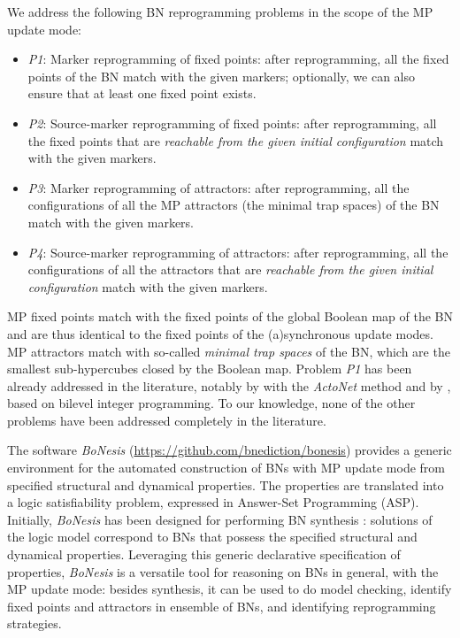 \documentclass[PCJ,Unicode,screen,mode=plain]{cedram}
\begin{document}
We address the following BN reprogramming problems in the scope of the
MP update mode:

\begin{itemize}
\item
  \emph{P1}: Marker reprogramming of fixed points: after reprogramming,
  all the fixed points of the BN match with the given markers;
  optionally, we can also ensure that at least one fixed point exists.
\item
  \emph{P2}: Source-marker reprogramming of fixed points: after
  reprogramming, all the fixed points that are \emph{reachable from the
  given initial configuration} match with the given markers.
\item
  \emph{P3}: Marker reprogramming of attractors: after reprogramming,
  all the configurations of all the MP attractors (the minimal trap
  spaces) of the BN match with the given markers.
\item
  \emph{P4}: Source-marker reprogramming of attractors: after
  reprogramming, all the configurations of all the attractors that are
  \emph{reachable from the given initial configuration} match with the
  given markers.
\end{itemize}

MP fixed points match with the fixed points of the global Boolean map of
the BN and are thus identical to the fixed points of the (a)synchronous
update modes. MP attractors match with so-called \emph{minimal trap
spaces} of the BN, which are the smallest sub-hypercubes closed by the
Boolean map. Problem \emph{P1} has been already addressed in the
literature, notably by \citet{Biane2018} with the \emph{ActoNet} method
and by \citet{Moon22}, based on bilevel integer programming. To our
knowledge, none of the other problems have been addressed completely in
the literature.

The software \emph{BoNesis} (\href{https://github.com/bnediction/bonesis}{https://github.com/bnediction/bonesis})
provides a generic environment for the automated construction of BNs
with MP update mode from specified structural and dynamical properties.
The properties are translated into a logic satisfiability problem,
expressed in Answer-Set Programming (ASP). Initially, \emph{BoNesis} has
been designed for performing BN synthesis \citep{bn-synthesis-ICTAI19}:
solutions of the logic model correspond to BNs that possess the
specified structural and dynamical properties. Leveraging this generic
declarative specification of properties, \emph{BoNesis} is a versatile
tool for reasoning on BNs in general, with the MP update mode: besides
synthesis, it can be used to do model checking, identify fixed points
and attractors in ensemble of BNs, and identifying reprogramming
strategies.
\end{document}
